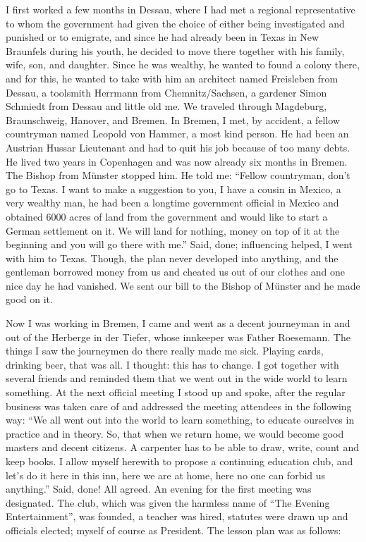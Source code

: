 \documentclass{article}
\begin{document}
I first worked a few months in Dessau, where I had met a regional representative to whom the government had given the choice of either being investigated and punished or to emigrate, and since he had already been in Texas in New Braunfels during his youth, he decided to move there together with his family, wife, son, and daughter. Since he was wealthy, he wanted to found a colony there, and for this, he wanted to take with him an architect named Freisleben from Dessau, a toolsmith Herrmann from Chemnitz/Sachsen, a gardener Simon Schmiedt from Dessau and little old me. We traveled through Magdeburg, Braunschweig, Hanover, and Bremen. In Bremen, I met, by accident, a fellow countryman named Leopold von Hammer, a most kind person. He had been an Austrian Hussar Lieutenant and had to quit his job because of too many debts. He lived two years in Copenhagen and was now already six months in Bremen. The Bishop from Münster stopped him. He told me: ``Fellow countryman, don't go to Texas. I want to make a suggestion to you, I have a cousin in Mexico, a very wealthy man, he had been a longtime government official in Mexico and obtained 6000 acres of land from the government and would like to start a German settlement on it. We will land for nothing, money on top of it at the beginning and you will go there with me.'' Said, done; influencing helped, I went with him to Texas. Though, the plan never developed into anything, and the gentleman borrowed money from us and cheated us out of our clothes and one nice day he had vanished. We sent our bill to the Bishop of Münster and he made good on it.

Now I was working in Bremen, I came and went as a decent journeyman in and out of the Herberge in der Tiefer, whose innkeeper was Father Roesemann. The things I saw the journeymen do there really made me sick. Playing cards, drinking beer, that was all. I thought: this has to change. I got together with several friends and reminded them that we went out in the wide world to learn something. At the next official meeting I stood up and spoke, after the regular business was taken care of and addressed the meeting attendees in the following way: ``We all went out into the world to learn something, to educate ourselves in practice and in theory. So, that when we return home, we would become good masters and decent citizens. A carpenter has to be able to draw, write, count and keep books. I allow myself herewith to propose a continuing education club, and let's do it here in this inn, here we are at home, here no one can forbid us anything.'' Said, done! All agreed. An evening for the first meeting was designated. The club, which was given the harmless name of ``The Evening Entertainment'', was founded, a teacher was hired, statutes were drawn up and officials elected; myself of course as President. The lesson plan was as follows:
\end{document}

